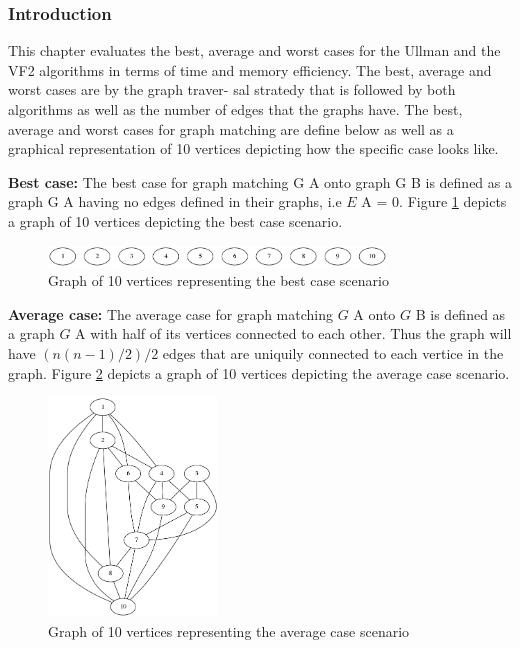 
\subsubsection{Introduction}
This chapter evaluates the best, average and worst cases for the Ullman and the VF2 algorithms in
terms of time and memory efficiency. The best, average and worst cases are by the graph traver-
sal stratedy that is followed by both algorithms as well as the number of edges that the graphs have.\newline\newline
The best, average and worst cases for graph matching are define below as well as a graphical representation of 10 vertices 
depicting how the specific case looks like.

\textbf{Best case:} The best case for graph matching G A onto graph G B is defined as a graph G A having
no edges defined in their graphs, i.e $E$ {\tiny A} = 0. Figure \ref{fig:best_case} depicts a graph of 10 vertices depicting the
best case scenario.

\begin{figure}[H]
  \begin{center}
      \includegraphics[width=0.8\textwidth]{best.png}
  \end{center}    
  \caption{Graph of 10 vertices representing the best case scenario}
  \label{fig:best_case}
\end{figure}

\textbf{Average case:} The average case for graph matching $G$ {\tiny A} onto $G$ {\tiny B} is defined as a graph $G$ {\tiny A} with
half of its vertices connected to each other. Thus the graph will have $(n(n − 1)/2)/2$ edges that are uniquily connected to each vertice in 
the graph. Figure \ref{fig:average_case} depicts a graph of 10 vertices depicting the average case scenario.

\begin{figure}[H]
  \begin{center}
      \includegraphics[width=0.4\textwidth]{average.png}
  \end{center}    
  \caption{Graph of 10 vertices representing the average case scenario}
  \label{fig:average_case}
\end{figure}

